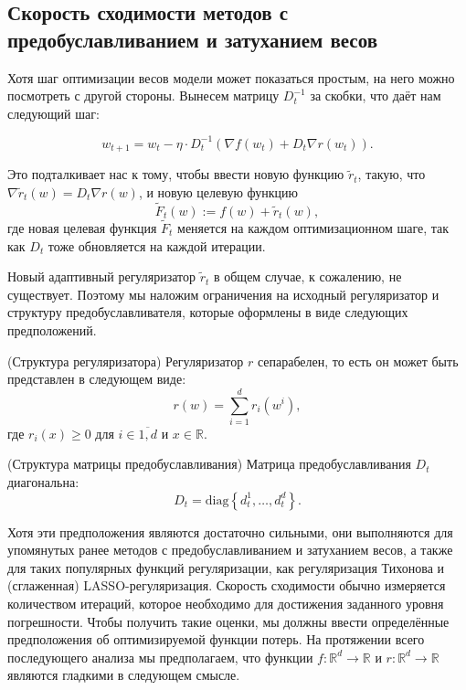\subsection{Скорость сходимости методов с предобуславливанием и затуханием весов}

Хотя шаг оптимизации весов модели может показаться простым, на него можно посмотреть с другой стороны. Вынесем матрицу $D_t^{-1}$ за скобки, что даёт нам следующий шаг:

\begin{equation}
\label{eq:wd_step}
w_{t+1} = w_t - \eta \cdot D_t^{-1} (\nabla f(w_t) + D_t \nabla r(w_t)).
\end{equation}

Это подталкивает нас к тому, чтобы ввести новую функцию $\widetilde{r}_t$, такую, что $\nabla \widetilde{r}_t(w) = D_t \nabla r(w)$, и новую целевую функцию
\begin{equation} \label{F_tilde}
    \widetilde{F}_t(w) := f(w) + \widetilde{r}_t(w),
\end{equation}
где новая целевая функция $\widetilde{F}_t$ меняется на каждом оптимизационном шаге, так как $D_t$ тоже обновляется на каждой итерации.

Новый адаптивный регуляризатор $\widetilde{r}_t$ в общем случае, к сожалению, не существует. Поэтому мы наложим ограничения на исходный регуляризатор и структуру предобуславливателя, которые оформлены в виде следующих предположений.

\begin{assumption}{(Структура регуляризатора)}
    \label{ass:regstruct}
    Регуляризатор $r$ сепарабелен, то есть он может быть представлен в следующем виде:
    $$r(w) = \sum_{i=1}^d r_i(w^i),$$
    где $r_i(x) \ge 0$ для $i \in \overline{1, d}$ и $x \in \mathbb{R}$.
\end{assumption}

\begin{assumption}{(Структура матрицы предобуславливания)}
    \label{ass:precondstruct}
    Матрица предобуславливания $D_t$ диагональна:
    $$ D_t = \textrm{diag} \left\{ d_t^1, \ldots, d_t^d \right\}.$$
\end{assumption}

Хотя эти предположения являются достаточно сильными, они выполняются для упомянутых ранее методов с предобуславливанием и затуханием весов, а также для таких популярных функций регуляризации, как регуляризация Тихонова и (сглаженная) LASSO-регуляризация.
Скорость сходимости обычно измеряется количеством итераций, которое необходимо для достижения заданного уровня погрешности. Чтобы получить такие оценки, мы должны ввести определённые предположения об оптимизируемой функции потерь. На протяжении всего последующего анализа мы предполагаем, что функции $f : \mathbb{R}^d \rightarrow \mathbb{R}$ и $r : \mathbb{R}^d \rightarrow \mathbb{R}$ являются гладкими в следующем смысле.

